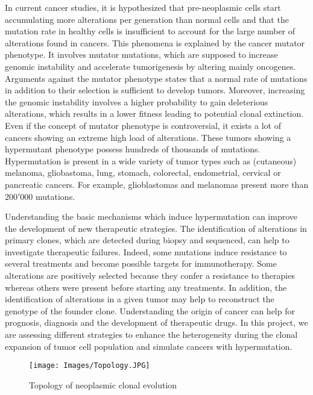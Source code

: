 \documentclass[a4paper]{article}
\begin{document}
\begin{multicols}{2}
In current cancer studies, it is hypothesized that pre-neoplasmic cells start accumulating more alterations per generation than normal cells and that the mutation rate in healthy cells is insufficient to account for the large number of alterations found in cancers\cite{RG, FPL}. This phenomena is explained by the cancer mutator phenotype. It involves mutator mutations, which are supposed to increase genomic instability and accelerate tumorigenesis by altering mainly oncogenes\cite{BL2, B}. Arguments against the mutator phenotype states that a normal rate of mutations in addition to their selection is sufficient to develop tumors. Moreover, increasing the genomic instability involves a higher probability to gain deleterious alterations, which results in a lower fitness leading to potential clonal extinction\cite{B}. Even if the concept of mutator phenotype is controversial, it exists a lot of cancers showing an extreme high load of alterations. These tumors showing a hypermutant phenotype possess hundreds of thousands of mutations\cite{GM, SE}. Hypermutation is present in a wide variety of tumor types such as (cutaneous) melanoma, gliobastoma, lung, stomach, colorectal, endometrial, cervical or pancreatic cancers\cite{RG, SE}. For example, glioblastomas and melanomas present more than $200'000$ mutations\cite{FPL}. 

Understanding the basic mechanisms which induce hypermutation can improve the development of new therapeutic strategies. The identification of alterations in primary clones, which are detected during biopsy and sequenced, can help to investigate therapeutic failures. Indeed, some mutations induce resistance to several treatments and become possible targets for immunotherapy. Some alterations are positively selected because they confer a resistance to therapies whereas others were present before starting any treatments. In addition, the identification of alterations in a given tumor may help to reconstruct the genotype of the founder clone. Understanding the origin of cancer can help for prognosis, diagnosis and the development of therapeutic drugs. In this project, we are assessing different strategies to enhance the heterogeneity during the clonal expansion of tumor cell population and simulate cancers with hypermutation.

\end{multicols}
\begin{figure}[b]
	\centering
	\texttt{[image: Images/Topology.JPG]}
	\caption{Topology of neoplasmic clonal evolution}
	\label{Topology}
\end{figure}
\end{document}
